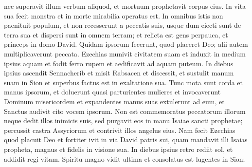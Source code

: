 \begin{biblechapter}
\begin{biblechapter}
\begin{biblechapter}
\begin{biblechapter}
\begin{biblechapter}
\begin{biblechapter}
\begin{biblechapter}
\begin{biblechapter}
\begin{biblechapter}
\begin{biblechapter}
\begin{biblechapter}
\begin{biblechapter}
\begin{biblechapter}
\begin{biblechapter}
\begin{biblechapter}
\begin{biblechapter}
\begin{biblechapter}
\begin{biblechapter}
\begin{biblechapter}
\begin{biblechapter}
\begin{biblechapter}
\begin{biblechapter}
\begin{biblechapter}
\begin{biblechapter}
\begin{biblechapter}
\begin{biblechapter}
\begin{biblechapter}
\begin{biblechapter}
\begin{biblechapter}
\begin{biblechapter}
\begin{biblechapter}
\begin{biblechapter}
\begin{biblechapter}
\begin{biblechapter}
\begin{biblechapter}
\begin{biblechapter}
\begin{biblechapter}
\begin{biblechapter}
\begin{biblechapter}
\begin{biblechapter}
\begin{biblechapter}
\begin{biblechapter}
\begin{biblechapter}
\begin{biblechapter}
\begin{biblechapter}
\begin{biblechapter}
\begin{biblechapter}
\begin{biblechapter}
 \verse nec superavit illum verbum aliquod,
 et mortuum prophetavit corpus eius.
 \verse In vita sua fecit monstra
 et in morte mirabilia operatus est.
 \verse In omnibus istis non paenituit populum,
 et non recesserunt a peccatis suis,
 usque dum eiecti sunt de terra sua
 et dispersi sunt in omnem terram;
 \verse et relicta est gens perpauca,
 et princeps in domo David.
 \verse Quidam ipsorum fecerunt, quod placeret Deo;
 alii autem multiplicaverunt peccata.
 \verse Ezechias munivit civitatem suam
 et induxit in medium ipsius aquam et fodit ferro rupem
 et aedificavit ad aquam puteum.
 \verse In diebus ipsius ascendit Sennacherib
 et misit Rabsacen et discessit,
 et sustulit manum suam in Sion
 et superbus factus est in exaltatione sua.
 \verse Tunc mota sunt corda et manus ipsorum,
 et doluerunt quasi parturientes mulieres
 \verse et invocaverunt Dominum misericordem
 et expandentes manus suas extulerunt ad eum,
 et Sanctus audivit cito vocem ipsorum.
 \verse Non est commemoratus peccatorum illorum
 neque dedit illos inimicis suis,
 sed purgavit eos in manu Isaiae sancti prophetae;
 \verse percussit castra Assyriorum
 et contrivit illos angelus eius.
 \verse Nam fecit Ezechias quod placuit Deo
 et fortiter ivit in via David patris sui,
 quam mandavit illi Isaias propheta, magnus et fidelis in visione sua.
 \verse In diebus ipsius retro rediit sol,
 et addidit regi vitam.
 \verse Spiritu magno vidit ultima
 et consolatus est lugentes in Sion;

\end{biblechapter}
\end{biblechapter}
\end{biblechapter}
\end{biblechapter}
\end{biblechapter}
\end{biblechapter}
\end{biblechapter}
\end{biblechapter}
\end{biblechapter}
\end{biblechapter}
\end{biblechapter}
\end{biblechapter}
\end{biblechapter}
\end{biblechapter}
\end{biblechapter}
\end{biblechapter}
\end{biblechapter}
\end{biblechapter}
\end{biblechapter}
\end{biblechapter}
\end{biblechapter}
\end{biblechapter}
\end{biblechapter}
\end{biblechapter}
\end{biblechapter}
\end{biblechapter}
\end{biblechapter}
\end{biblechapter}
\end{biblechapter}
\end{biblechapter}
\end{biblechapter}
\end{biblechapter}
\end{biblechapter}
\end{biblechapter}
\end{biblechapter}
\end{biblechapter}
\end{biblechapter}
\end{biblechapter}
\end{biblechapter}
\end{biblechapter}
\end{biblechapter}
\end{biblechapter}
\end{biblechapter}
\end{biblechapter}
\end{biblechapter}
\end{biblechapter}
\end{biblechapter}
\end{biblechapter}
